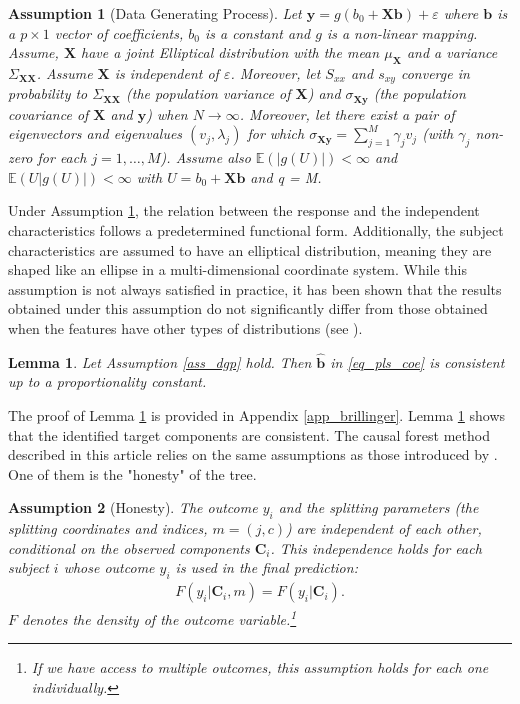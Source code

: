 \documentclass[12pt]{article}
\newtheorem{assump}{Assumption}[section]
\newtheorem{lemma}{Lemma}[section]
\begin{document}
\begin{assump}[Data Generating Process]\label{ass_dgp_1}
    Let $\mathbf{y} = g(b_0 + \mathbf{X}\mathbf{b}) + \varepsilon$ where $\mathbf{b}$ is a $p \times 1 $ vector of coefficients, $b_0$ is a constant and $g$ is a non-linear mapping. Assume, $\mathbf{X}$ have a joint Elliptical distribution with  the mean $\mu_{\mathbf{X}}$ and a variance $\Sigma_{\mathbf{X}\mathbf{X}}$. Assume $\mathbf{X}$ is independent of $\varepsilon$.  Moreover, let $S_{xx}$ and $s_{xy}$ converge in probability to $\Sigma_{\mathbf{X}\mathbf{X}}$ (the population variance of $\mathbf{X}$) and $\sigma_{\mathbf{X}\mathbf{y}}$ (the population covariance of $\mathbf{X}$ and $\mathbf{y}$) when $N \rightarrow \infty$. Moreover, let there exist a pair of eigenvectors and eigenvalues $(v_j, \lambda_j)$ for which $\sigma_{\mathbf{X}\mathbf{y}} = \sum_{j=1}^M\gamma_jv_j$ (with $\gamma_j$ non-zero for each $j = 1, \dots, M$).  Assume also $\mathbb{E}(|g(U)|) < \infty$ and $\mathbb{E}(U|g(U)|) < \infty$ with $U = b_0 +  \mathbf{X}\mathbf{b}$ and q = M. 
\end{assump} 


Under Assumption \ref{ass_dgp_1}, the relation between the response and the independent characteristics follows a predetermined functional form. Additionally, the subject characteristics are assumed to have an elliptical distribution, meaning they are shaped like an ellipse in a multi-dimensional coordinate system. While this assumption is not always satisfied in practice, it has been shown that the results obtained under this assumption do not significantly differ from those obtained when the features have other types of distributions (see \citealp{brillinger2012generalized}). 


\begin{lemma} \label{lemma_pls_consistency}
Let Assumption \ref{ass_dgp} hold. Then $\hat{\mathbf{b}}$ in \eqref{eq_pls_coe}  is consistent up to a proportionality constant. 
\end{lemma} 
The proof of Lemma \ref{lemma_pls_consistency} is provided in Appendix \ref{app_brillinger}. Lemma \ref{lemma_pls_consistency} shows that the identified target components are consistent. The causal forest method described in this article relies on the same assumptions as those introduced by \cite{wager2018estimation}. One of them is the "honesty" of the tree.

\begin{assump}[Honesty] \label{ass_honesty}
The outcome $y_i$ and the splitting parameters (the splitting coordinates and indices, $m = (j, c)$) are independent of each other, conditional on the observed components $\mathbf{C}_i$. This independence holds for each subject $i$ whose outcome $y_i$ is used in the final prediction:
\begin{align*}
    F(y_{i}|\mathbf{C}_i, m) = F(y_{i}|\mathbf{C}_i). 
\end{align*}
$F$ denotes the density of the outcome variable.\footnote{If we have access to multiple outcomes, this assumption holds for each one individually. } 
\end{assump} 
\end{document}
